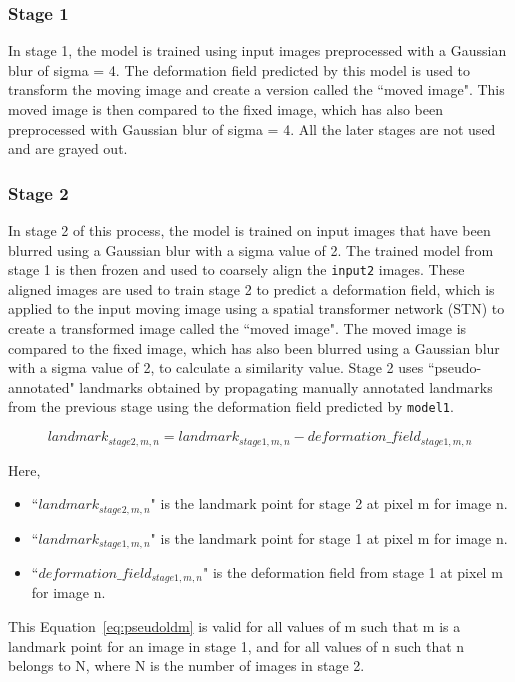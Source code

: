 \documentclass{book}
\begin{document}
	\subsubsection{Stage 1}
	In stage 1, the model is trained using input images preprocessed with a Gaussian blur of sigma = 4. The deformation field predicted by this model is used to transform the moving image and create a version called the ``moved image". This moved image is then compared to the fixed image, which has also been preprocessed with Gaussian blur of sigma = 4. All the later stages are not used and are grayed out.

	\subsubsection{Stage 2}
	In stage 2 of this process, the model is trained on input images that have been blurred using a Gaussian blur with a sigma value of 2. The trained model from stage 1 is then frozen and used to coarsely align the \texttt{input2} images. These aligned images are used to train stage 2 to predict a deformation field, which is applied to the input moving image using a spatial transformer network (STN) to create a transformed image called the ``moved image". The moved image is compared to the fixed image, which has also been blurred using a Gaussian blur with a sigma value of 2, to calculate a similarity value. Stage 2 uses ``pseudo-annotated" landmarks obtained by propagating manually annotated landmarks from the previous stage using the deformation field predicted by \texttt{model1}.
	
	\begin{equation}\label{eq:pseudoldm}
		landmark_{stage2,m,n} = landmark_{stage1,m,n} - deformation\_field_{stage1,m,n}
	\end{equation}
	
	Here, 
	\begin{itemize}
		\item ``$landmark_{stage2,m,n}$" is the landmark point for stage 2 at pixel m for image n.
		\item ``$landmark_{stage1,m,n}$" is the landmark point for stage 1 at pixel m for image n.
		\item ``$deformation\_field_{stage1,m,n}$" is the deformation field from stage 1 at pixel m for image n.    
	\end{itemize}
	
	This Equation~\ref{eq:pseudoldm} is valid for all values of m such that m is a landmark point for an image in stage 1, and for all values of n such that n belongs to N, where N is the number of images in stage 2.
\end{document}

